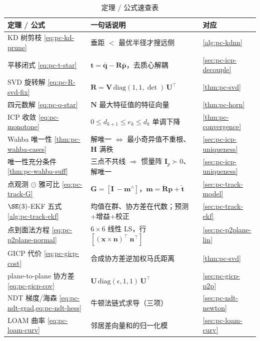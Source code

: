 \begin{table}[H]\centering\small
\caption{定理 / 公式速查表}
\begin{tabular}{lll}
\toprule
定理 / 公式 & 一句话说明 & 对应 \\
\midrule
KD 树剪枝 \cref{eq:pc-kd-prune} & 垂距 $<$ 最优半径才搜远侧 & \cref{alg:pc-kdnn} \\
平移闭式 \cref{eq:pc-t-star} & $\mathbf{t}=\bar{\mathbf{q}}-\mathbf{R}\bar{\mathbf{p}}$，去质心解耦 & \cref{sec:pc-icp-decouple} \\
SVD 旋转解 \cref{eq:pc-R-svd-fix} & $\mathbf{R}=\mathbf{V}\,\mathrm{diag}(1,1,\det)\,\mathbf{U}^\top$ & \cref{thm:pc-svd} \\
四元数解 \cref{eq:pc-q-star} & $\mathbf{N}$ 最大特征值的特征向量 & \cref{thm:pc-horn} \\
ICP 收敛 \cref{eq:pc-monotone} & $0\le d_{k+1}\le e_k\le d_k$ 单调下降 & \cref{thm:pc-convergence} \\
Wahba 唯一性 \cref{thm:pc-wahba-cases} & 解唯一 $\iff$ 最小奇异值不重根、$\mathbf{H}$ 满秩 & \cref{sec:pc-icp-uniqueness} \\
唯一性充分条件 \cref{thm:pc-wahba-suff} & 三点不共线 $\Rightarrow$ 惯量阵 $\mathbf{I}_p\succ0$、解唯一 & \cref{sec:pc-icp-uniqueness} \\
点观测 $\odot$ 雅可比 \cref{eq:pc-track-G} & $\mathbf{G}=[\mathbf{I}\ {-}\mathbf{m}^\wedge]$，$\mathbf{m}=\check{\mathbf{R}}\mathbf{p}+\check{\mathbf{t}}$ & \cref{sec:pc-track-model} \\
$\SE(3)$-EKF 五式 \cref{alg:pc-track-ekf} & 均值在群、协方差在代数；预测+增益+校正 & \cref{sec:pc-track-ekf} \\
点到面法方程 \cref{eq:pc-p2plane-normal} & $6\times6$ 线性 LS，行 $[(\mathbf{x}\times\mathbf{n})^\top\ \mathbf{n}^\top]$ & \cref{sec:pc-p2plane-lin} \\
GICP 代价 \cref{eq:pc-gicp-cost} & 合成协方差逆加权马氏距离 & \cref{thm:pc-svd} \\
plane-to-plane 协方差 \cref{eq:pc-gicp-cov} & $\mathbf{U}\,\mathrm{diag}(\epsilon,1,1)\,\mathbf{U}^\top$ & \cref{sec:pc-gicp-p2p} \\
NDT 梯度/海森 \cref{eq:pc-ndt-grad,eq:pc-ndt-hess} & 牛顿法链式求导（三项） & \cref{sec:pc-ndt-newton} \\
LOAM 曲率 \cref{eq:pc-loam-curv} & 邻居差向量和的归一化模 & \cref{sec:pc-loam-curv} \\
\bottomrule
\end{tabular}
\end{table}

